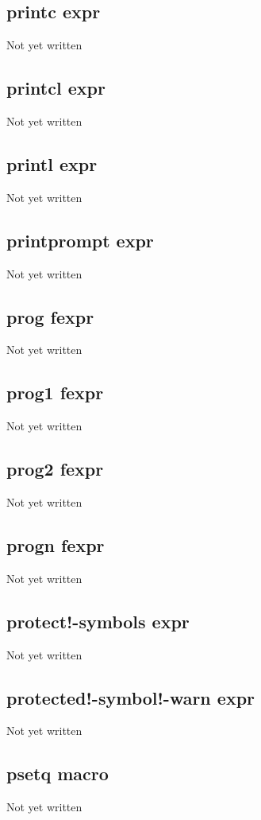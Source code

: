 \documentclass[a4paper,11pt]{article}
\begin{document}
\subsection{\ttfamily printc expr}
Not yet written

\subsection{\ttfamily printcl expr}
Not yet written

\subsection{\ttfamily printl expr}
Not yet written

\subsection{\ttfamily printprompt expr}
Not yet written

\subsection{\ttfamily prog fexpr}
Not yet written

\subsection{\ttfamily prog1 fexpr}
Not yet written

\subsection{\ttfamily prog2 fexpr}
Not yet written

\subsection{\ttfamily progn fexpr}
Not yet written

\subsection{\ttfamily protect!-symbols expr}
Not yet written

\subsection{\ttfamily protected!-symbol!-warn expr}
Not yet written

\subsection{\ttfamily psetq macro}
Not yet written
\end{document}
